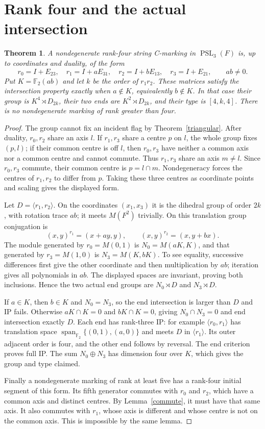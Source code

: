 \documentclass[11pt]{article}
\newtheorem{theorem}{Theorem}
\newcommand{\F}{\mathbb F}
\newcommand{\PSL}{\operatorname{PSL}}
\newcommand{\Span}{\operatorname{span}}
\begin{document}
\section*{Rank four and the actual intersection}
\begin{theorem}\label{four}
A nondegenerate rank-four string C-marking in $\PSL_3(F)$ is, up to
coordinates and duality, of the form
\[
 r_0=I+E_{23},\quad r_1=I+aE_{31},\quad
 r_2=I+bE_{13},\quad r_3=I+E_{21},\qquad ab\ne0.
\]
Put $K=\F_2(ab)$ and let $k$ be the order of $r_1r_2$.
These matrices satisfy the intersection property exactly when $a\notin K$,
equivalently $b\notin K$. In that case their group is
$K^4\rtimes D_{2k}$, their two ends are $K^2\rtimes D_{2k}$,
and their type is $[4,k,4]$. There is no nondegenerate marking of
rank greater than four.
\end{theorem}
\begin{proof}
The group cannot fix an incident flag by Theorem~\ref{triangular}.
After duality, $r_0,r_2$ share an axis $l$. If $r_1,r_3$ share a
centre $p$ on $l$, the whole group fixes $(p,l)$; if their common
centre is off $l$, then $r_0,r_3$ have neither a common axis nor a
common centre and cannot commute. Thus $r_1,r_3$ share an axis
$m\ne l$. Since $r_0,r_3$ commute, their common centre is
$p=l\cap m$. Nondegeneracy forces the centres of $r_1,r_2$ to
differ from $p$. Taking these three centres as coordinate points and
scaling gives the displayed form.

Let $D=\langle r_1,r_2\rangle$. On the coordinates $(x_1,x_3)$
it is the dihedral group of order $2k$, with rotation trace $ab$;
it meets $M(F^2)$ trivially. On this translation group conjugation is
\[
 (x,y)^{r_1}=(x+a y,y),\qquad
 (x,y)^{r_2}=(x,y+b x).
\]
The module generated by $r_0=M(0,1)$ is
$N_0=M(aK,K)$, and that generated by $r_3=M(1,0)$ is
$N_3=M(K,bK)$. To see equality, successive differences first give
the other coordinate and then multiplication by $ab$; iteration gives
all polynomials in $ab$. The displayed spaces are invariant, proving
both inclusions. Hence the two actual end groups are $N_0\rtimes D$
and $N_3\rtimes D$.

If $a\in K$, then $b\in K$ and $N_0=N_3$, so the end intersection
is larger than $D$ and IP fails. Otherwise $aK\cap K=0$ and
$bK\cap K=0$, giving $N_0\cap N_3=0$ and end intersection exactly
$D$. Each end has rank-three IP: for example
$\langle r_0,r_1\rangle$ has translation space
$\Span_{\F_2}\{(0,1),(a,0)\}$ and meets $D$ in
$\langle r_1\rangle$. Its outer adjacent order is four, and the
other end follows by reversal. The end criterion proves full IP.
The sum $N_0\oplus N_3$ has dimension four over $K$, which gives
the group and type claimed.

Finally a nondegenerate marking of rank at least five has a rank-four
initial segment of this form. Its fifth generator commutes with $r_0$
and $r_2$, which have a common axis and distinct centres. By
Lemma~\ref{commute}, it must have that same axis. It also commutes
with $r_1$, whose axis is different and whose centre is not on the
common axis. This is impossible by the same lemma.
\end{proof}
\end{document}

